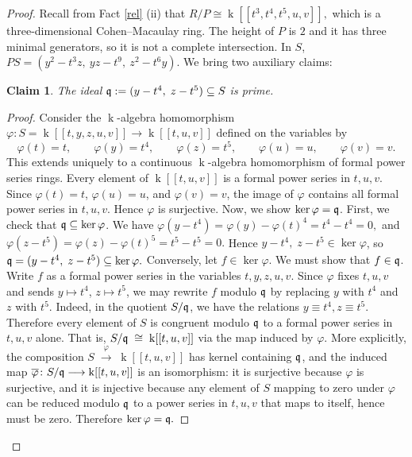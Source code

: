\documentclass[10pt,a4paper]{amsart}
\newtheorem{claim}[theorem]{Claim}
\theoremstyle{definition}
\theoremstyle{remark}
\newcommand{\kk}{\operatorname{k}}
\newcommand{\q}{\frak{q}}
\begin{document}
\begin{proof}
	Recall from  {Fact} \ref{rel} (ii) that
	\(
	R/P\cong\kk[[t^3,t^4,t^5,u,v]],
	\) which is a three-dimensional Cohen--Macaulay ring. The height of $P$ is
	$2$ and it has three minimal generators, so it is not a complete intersection.
	In $S$,
	\(
	PS=(y^2-t^3z,\ yz-t^9,\ z^2-t^6y).
	\)
We bring two auxiliary claims:	
\begin{claim}\label{1}
		The ideal
		\(
		\q:=(y-t^4,\;z-t^5)\subseteq S
		\)
		is prime.
	\end{claim}
	
	\begin{proof}
Consider the \(\kk\)-algebra homomorphism
		\(
		\varphi\colon S=\kk[[t,y,z,u,v]]\to \kk[[t,u,v]]
		\)
		defined on the variables by
		\[
		\varphi(t)=t,\qquad
		\varphi(y)=t^4,\qquad
		\varphi(z)=t^5,\qquad
		\varphi(u)=u,\qquad
		\varphi(v)=v.
		\]
		This extends uniquely to a continuous \(\kk\)-algebra homomorphism of
		formal power series rings.
		Every element of \(\kk[[t,u,v]]\) is a formal power series in
		\(t,u,v\). Since \(\varphi(t)=t\), \(\varphi(u)=u\), and
		\(\varphi(v)=v\), the image of \(\varphi\) contains all formal power
		series in \(t,u,v\). Hence \(\varphi\) is surjective.
Now, we show \(\ker\varphi=\q\). 
		First, we check that \(\q\subseteq\ker\varphi\). We have
		\(
		\varphi(y-t^4)=\varphi(y)-\varphi(t)^4=t^4-t^4=0,
		\)
		and
		\(
		\varphi(z-t^5)=\varphi(z)-\varphi(t)^5=t^5-t^5=0.
		\)
		Hence \(y-t^4,\;z-t^5\in\ker\varphi\), so
		\(
		\q=(y-t^4,\;z-t^5)\subseteq\ker\varphi.
		\)
		Conversely, let \(f\in\ker\varphi\). We must show that
		\(f\in\q\). Write \(f\) as a formal power series in the variables
		\(t,y,z,u,v\). Since \(\varphi\) fixes \(t,u,v\) and sends
		\(y\mapsto t^4\), \(z\mapsto t^5\), we may rewrite \(f\) modulo
		\(\q\) by replacing \(y\) with \(t^4\) and \(z\) with \(t^5\).
		Indeed, in the quotient \(S/\q\), we have the relations
		\(
		y\equiv t^4,  z\equiv t^5.
		\)
		Therefore every element of \(S\) is congruent modulo \(\q\) to a
		formal power series in \(t,u,v\) alone. That is,
		\(
		S/\q\;\cong\;\kk[[t,u,v]]
		\)
		via the map induced by \(\varphi\).
		More explicitly, the composition
		\(
		S\;\xrightarrow{\;\varphi\;}\;\kk[[t,u,v]]
		\)
		has kernel containing \(\q\), and the induced map
		\(
		\overline{\varphi}\colon S/\q\longrightarrow \kk[[t,u,v]]
		\)
		is an isomorphism: it is surjective because \(\varphi\) is
		surjective, and it is injective because any element of \(S\) mapping
		to zero under \(\varphi\) can be reduced modulo \(\q\) to a power
		series in \(t,u,v\) that maps to itself, hence must be zero.
		Therefore
		\(
		\ker\varphi=\q.
		\)
	\end{proof}
	

\end{proof}
\end{document}
